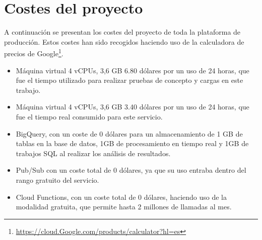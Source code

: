 \section{Costes del proyecto}\label{sec:costes-del-proyecto}
A continuación se presentan los costes del proyecto de toda la plataforma de producción.
Estos costes han sido recogidos haciendo uso de la calculadora de precios de Google\footnote{\url{https://cloud.Google.com/products/calculator?hl=es}}.

\begin{itemize}
    \item Máquina virtual 4 vCPUs, 3,6 GB 6.80 dólares por un uso de 24 horas, que fue el tiempo utilizado para realizar pruebas de concepto y cargas en este trabajo.
    \item Máquina virtual 4 vCPUs, 3,6 GB 3.40 dólares por un uso de 24 horas, que fue el tiempo real consumido para este servicio.
    \item BigQuery, con un coste de 0 dólares para un almacenamiento de 1 GB de tablas en la base de datos, 1GB de procesamiento en tiempo real y 1GB de trabajos SQL al realizar los análisis de resultados.
    \item Pub/Sub con un coste total de 0 dólares, ya que su uso entraba dentro del rango gratuito del servicio.
    \item Cloud Functions, con un coste total de 0 dólares, haciendo uso de la modalidad gratuita, que permite hasta 2 millones de llamadas al mes.
\end{itemize}